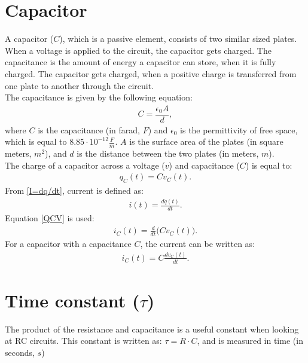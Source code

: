 \section{Capacitor}
A capacitor ($C$), which is a passive element, consists of two similar sized plates. When a voltage is applied to the circuit, the capacitor gets charged. The capacitance is the amount of energy a capacitor can store, when it is fully charged. The capacitor gets charged, when a positive charge is transferred from one plate to another through the circuit.
\\
The capacitance is given by the following equation:
\begin{align*}
C=\dfrac{\epsilon_{0}A}{d},
\end{align*}
where $C$ is the capacitance (in farad, $F$) and $\epsilon_{0}$ is the permittivity of free space, which is equal to $8.85 \cdot 10^{-12}                                                 \frac{F}{m}$. $A$ is the surface area of the plates (in square meters, $m^{2}$), and $d$ is the distance between the two plates (in meters, $m$).
\\
The charge of a capacitor across a voltage ($v$) and capacitance ($C$) is equal to:
\begin{align}
\label{QCV}
q_C(t) = Cv_C(t).	
\end{align}
From \eqref{I=dq/dt}, current is defined as:
\begin{align*}
	i(t) = \frac{dq(t)}{dt}.
\end{align*}
Equation \eqref{QCV} is used:
\begin{align*}
	i_C(t) = \frac{d}{dt}\big(Cv_C(t)\big).
\end{align*}
For a capacitor with a capacitance $C$, the current can be written as:
\begin{align}
	i_C(t) = C\frac{dv_C(t)}{dt}.\label{iC}
\end{align}


\section{Time constant ($\tau$)}

The product of the resistance and capacitance is a useful  constant when looking at RC circuits. This constant is written as: $\tau = R \cdot C$, and is measured in time (in seconds, $s$)